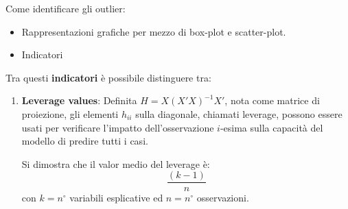 \documentclass[a4page, 11pt]{article} %
\begin{document}
Come identificare gli outlier:
\begin{itemize}[noitemsep]
\item Rappresentazioni grafiche per mezzo di box-plot e scatter-plot.
\item Indicatori
\end{itemize}
Tra questi \textbf{indicatori} è possibile distinguere tra:
\begin{enumerate}
\item \textbf{Leverage values}: Definita $H = X(X'X)^{-1}X'$, nota come matrice di proiezione, gli elementi $h_{ii}$ sulla diagonale, chiamati leverage, possono essere usati per verificare l'impatto dell'osservazione $i$-esima sulla capacità del modello di predire tutti i casi.

Si dimostra che il valor medio del leverage è:
\begin{equation*} 
\frac{(k-1)}{n}
\end{equation*}
con $k = n^\circ$ variabili esplicative ed $n = n^\circ$ osservazioni.


\end{enumerate}
\end{document}
